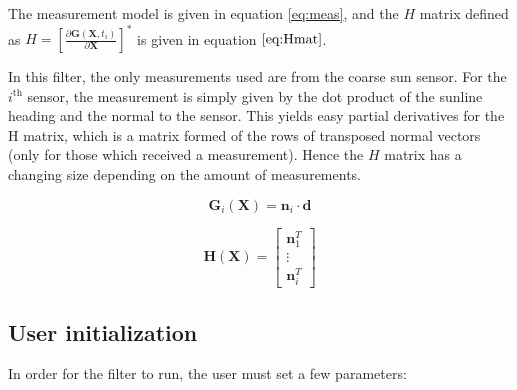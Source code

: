 \documentclass[]{BasiliskReportMemo}
\begin{document}
The measurement model is given in equation \ref{eq:meas}, and the $H$ matrix defined as $H = \left[\frac{\partial \bm G (\bm X, t_i)}{\partial \bm X}\right]^{*}$ is given in equation $\ref{eq:Hmat}$. 

In this filter, the only measurements used are from the coarse sun sensor. For the $i^\mathrm{th}$ sensor, the measurement is simply given by the dot product of the sunline heading and the normal to the sensor. This yields easy partial derivatives for the H matrix, which is a matrix formed of the rows of transposed normal vectors (only for those which received a measurement). Hence the $H$ matrix has a changing size depending on the amount of measurements. 

\begin{equation}\label{eq:meas}
\bm G_i(\bm X) = \bm n_i \cdot \bm d
\end{equation}

\begin{equation}\label{eq:Hmat}
\bm H(\bm X) = \begin{bmatrix} \bm n_1^T \\ \vdots \\ \bm n_i^T \end{bmatrix} 
\end{equation}

\subsection{User initialization}

In order for the filter to run, the user must set a few parameters:
\end{document}
